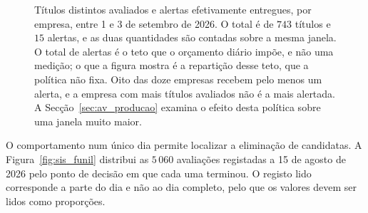 \begin{figure}[htbp]
\caption[Seletividade do sistema por empresa]{Títulos distintos avaliados e alertas
efetivamente entregues, por empresa, entre 1 e 3 de setembro de 2026. O total é de $743$ títulos e
$15$ alertas, e as duas quantidades são contadas sobre a mesma janela. O total de alertas é o teto
que o orçamento diário impõe, e não uma medição; o que a figura mostra é a repartição desse teto,
que a política não fixa. Oito das doze empresas recebem pelo menos um alerta, e a empresa com mais
títulos avaliados não é a mais alertada. A Secção~\ref{sec:av_producao} examina o efeito desta
política sobre uma janela muito maior.}
\label{fig:sis_seletividade}
\end{figure}


O comportamento num único dia permite localizar a eliminação de candidatas. A
Figura~\ref{fig:sis_funil} distribui as $5\,060$ avaliações registadas a 15 de agosto de 2026 pelo
ponto de decisão em que cada uma terminou. O registo lido corresponde a parte do dia e não ao dia
completo, pelo que os valores devem ser lidos como proporções.

